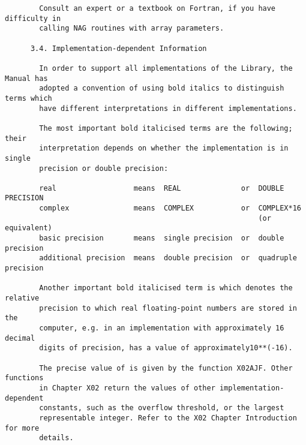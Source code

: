 \begin{small}
\begin{verbatim}
        Consult an expert or a textbook on Fortran, if you have difficulty in     
        calling NAG routines with array parameters.                               
                                                                                  
      3.4. Implementation-dependent Information                                   
                                                                                  
        In order to support all implementations of the Library, the Manual has    
        adopted a convention of using bold italics to distinguish terms which     
        have different interpretations in different implementations.              
                                                                                  
        The most important bold italicised terms are the following; their         
        interpretation depends on whether the implementation is in single         
        precision or double precision:                                            
                                                                                  
        real                  means  REAL              or  DOUBLE PRECISION       
        complex               means  COMPLEX           or  COMPLEX*16             
                                                           (or equivalent)        
        basic precision       means  single precision  or  double precision       
        additional precision  means  double precision  or  quadruple precision    
                                                                                  
        Another important bold italicised term is which denotes the relative      
        precision to which real floating-point numbers are stored in the          
        computer, e.g. in an implementation with approximately 16 decimal         
        digits of precision, has a value of approximately10**(-16).               
                                                                                  
        The precise value of is given by the function X02AJF. Other functions     
        in Chapter X02 return the values of other implementation-dependent        
        constants, such as the overflow threshold, or the largest                 
        representable integer. Refer to the X02 Chapter Introduction for more     
        details.                                                                  
                                                                                  

\end{verbatim}
\end{small}
